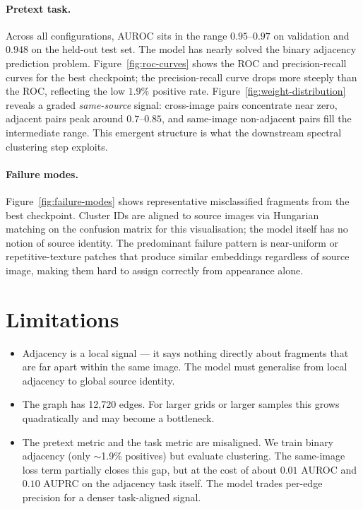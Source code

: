 \documentclass[12pt, a4paper]{article}
\begin{document}
\paragraph{Pretext task.}
Across all configurations, AUROC sits in the range $0.95$--$0.97$ on
validation and $0.948$ on the held-out test set. The model has nearly solved
the binary adjacency prediction problem. Figure~\ref{fig:roc-curves} shows the
ROC and precision-recall curves for the best checkpoint; the precision-recall
curve drops more steeply than the ROC, reflecting the low $1.9\%$ positive
rate. Figure~\ref{fig:weight-distribution} reveals a graded \emph{same-source}
signal: cross-image pairs concentrate near zero, adjacent pairs peak around
$0.7$--$0.85$, and same-image non-adjacent pairs fill the intermediate range.
This emergent structure is what the downstream spectral clustering step
exploits.





\paragraph{Failure modes.}
Figure~\ref{fig:failure-modes} shows representative misclassified fragments
from the best checkpoint. Cluster IDs are aligned to source images via
Hungarian matching on the confusion matrix for this visualisation; the model
itself has no notion of source identity. The predominant failure pattern is
near-uniform or repetitive-texture patches that produce similar embeddings
regardless of source image, making them hard to assign correctly from
appearance alone.




\section{Limitations}

\begin{itemize}
    \item Adjacency is a local signal — it says nothing directly about fragments that are
          far apart within the same image. The model must generalise from local adjacency
          to global source identity.
    \item The graph has 12,720 edges. For larger grids or larger samples this grows
          quadratically and may become a bottleneck.
    \item The pretext metric and the task metric are misaligned. We train binary
          adjacency (only $\sim$1.9\% positives) but evaluate clustering. The
          same-image loss term partially closes this gap, but at the cost
          of about $0.01$ AUROC and $0.10$ AUPRC on the adjacency task itself.
          The model trades per-edge precision for a denser task-aligned signal.
\end{itemize}
\end{document}
